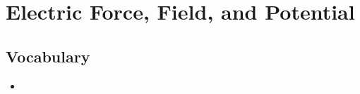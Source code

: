 \section{Electric Force, Field, and Potential}

\subsection{Vocabulary}
\begin{itemize}
    \item 
\end{itemize}

